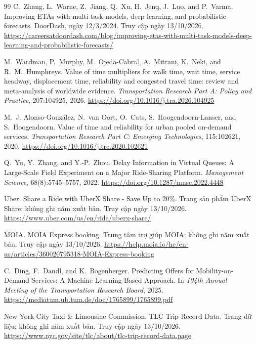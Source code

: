 \begin{thebibliography}{99}
C.~Zhang, L.~Warne, Z.~Jiang, Q.~Xu, H.~Jenq, J.~Luo, and P.~Varma.
\newblock Improving ETAs with multi-task models, deep learning, and probabilistic forecasts.
\newblock DoorDash, ngày 12/3/2024. Truy cập ngày 13/10/2026.
\newblock \url{https://careersatdoordash.com/blog/improving-etas-with-multi-task-models-deep-learning-and-probabilistic-forecasts/}

M.~Wardman, P.~Murphy, M.~Ojeda-Cabral, A.~Mitrani, K.~Neki, and R.~M.~Humphreys.
\newblock Value of time multipliers for walk time, wait time, service headway, displacement time, reliability and congested travel time: review and meta-analysis of worldwide evidence.
\newblock \emph{Transportation Research Part A: Policy and Practice}, 207:104925, 2026.
\newblock \url{https://doi.org/10.1016/j.tra.2026.104925}

M.~J. Alonso-González, N.~van Oort, O.~Cats, S.~Hoogendoorn-Lanser, and S.~Hoogendoorn.
\newblock Value of time and reliability for urban pooled on-demand services.
\newblock \emph{Transportation Research Part C: Emerging Technologies}, 115:102621, 2020.
\newblock \url{https://doi.org/10.1016/j.trc.2020.102621}

Q.~Yu, Y.~Zhang, and Y.-P.~Zhou.
\newblock Delay Information in Virtual Queues: A Large-Scale Field Experiment on a Major Ride-Sharing Platform.
\newblock \emph{Management Science}, 68(8):5745--5757, 2022.
\newblock \url{https://doi.org/10.1287/mnsc.2022.4448}

Uber.
\newblock Share a Ride with UberX Share - Save Up to 20\%.
\newblock Trang sản phẩm UberX Share; không ghi năm xuất bản. Truy cập ngày 13/10/2026.
\newblock \url{https://www.uber.com/us/en/ride/uberx-share/}

MOIA.
\newblock MOIA Express booking.
\newblock Trung tâm trợ giúp MOIA; không ghi năm xuất bản. Truy cập ngày 13/10/2026.
\newblock \url{https://help.moia.io/hc/en-us/articles/360020795318-MOIA-Express-booking}

C.~Ding, F.~Dandl, and K.~Bogenberger.
\newblock Predicting Offers for Mobility-on-Demand Services: A Machine Learning-Based Approach.
\newblock In \emph{104th Annual Meeting of the Transportation Research Board}, 2025.
\newblock \url{https://mediatum.ub.tum.de/doc/1765899/1765899.pdf}

New York City Taxi \& Limousine Commission.
\newblock TLC Trip Record Data.
\newblock Trang dữ liệu; không ghi năm xuất bản. Truy cập ngày 13/10/2026.
\newblock \url{https://www.nyc.gov/site/tlc/about/tlc-trip-record-data.page}


\end{thebibliography}
